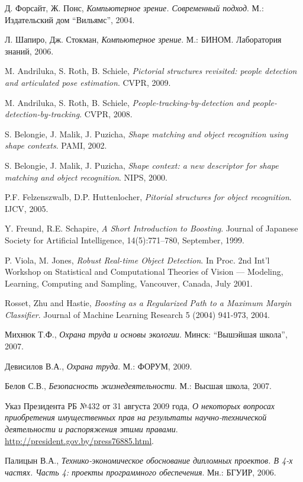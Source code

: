 \begin{thebibliography}{99}

  Д. Форсайт, Ж. Понс,
  \emph{Компьютерное зрение. Современный подход}.
  М.: Издательский дом ``Вильямс'',
  2004.

  Л. Шапиро, Дж. Стокман,
  \emph{Компьютерное зрение}.
  М.: БИНОМ. Лаборатория знаний,
  2006.

  M. Andriluka, S. Roth, B. Schiele,
  \emph{Pictorial structures revisited: people detection and articulated pose estimation}.
  CVPR,
  2009.

  M. Andriluka, S. Roth, B. Schiele,
  \emph{People-tracking-by-detection and people-detection-by-tracking}.
  CVPR,
  2008.

  S. Belongie, J. Malik, J. Puzicha,
  \emph{Shape matching and object recognition using shape contexts}.
  PAMI,
  2002.

  S. Belongie, J. Malik, J. Puzicha,
  \emph{Shape context: a new descriptor for shape matching and object recognition}.
  NIPS,
  2000.

  P.F. Felzenszwalb, D.P. Huttenlocher,
  \emph{Pitorial structures for object recognition}.
  IJCV,
  2005.

  Y. Freund, R.E. Schapire,
  \emph{A Short Introduction to Boosting}.
  Journal of Japanese Society for Artificial Intelligence, 14(5):771--780, September,
  1999.

  P. Viola, M. Jones,
  \emph{Robust Real-time Object Detection}.
  In Proc. 2nd Int'l Workshop on Statistical and Computational Theories of Vision --- Modeling, Learning, Computing and Sampling, Vancouver, Canada,
  July 2001.

  Rosset, Zhu and Hastie,
  \emph{Boosting as a Regularized Path to a Maximum Margin Classifier}.
  Journal of Machine Learning Research 5 (2004) 941-973,
  2004.

  Михнюк Т.Ф.,
  \emph{Охрана труда и основы экологии}.
  Минск: ``Вышэйшая школа'',
  2007.

  Девисилов В.А.,
  \emph{Охрана труда}.
  М.: ФОРУМ,
  2009.

  Белов С.В.,
  \emph{Безопасность жизнедеятельности}.
  М.: Высшая школа,
  2007.

  Указ Президента РБ №432 от 31 августа 2009 года,
  \emph{О некоторых вопросах приобретения имущественных прав на результаты научно-технической деятельности и распоряжения этими правами}.
  \href{http://president.gov.by/press76885.html}{http://president.gov.by/press76885.html}.

  Палицын В.А.,
  \emph{Технико-экономическое обоснование дипломных проектов. В 4-х частях. Часть 4: проекты программного обеспечения}.
  Мн.: БГУИР,
  2006.

\end{thebibliography}
